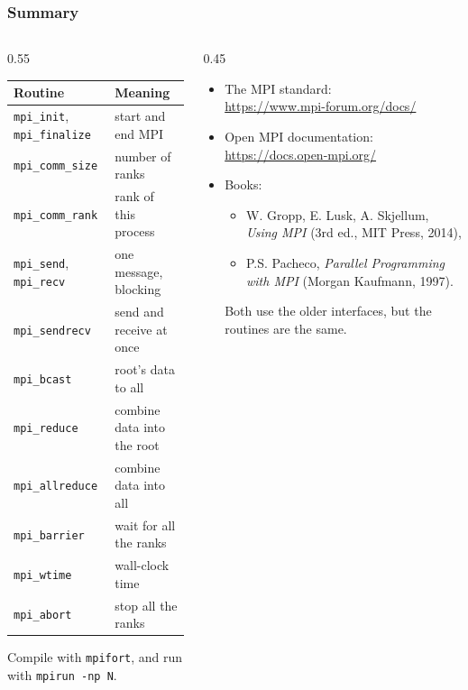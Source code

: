 \begin{frame}
  \frametitle{Summary}
  \begin{columns}[T]
    \begin{column}{0.55\textwidth}
      \centering
      \footnotesize
      \begin{tabular}{ll}
        \textbf{Routine} & \textbf{Meaning} \\
        \hline
        \texttt{mpi\_init}, \texttt{mpi\_finalize} & start and end MPI \\
        \texttt{mpi\_comm\_size}  & number of ranks \\
        \texttt{mpi\_comm\_rank}  & rank of this process \\
        \texttt{mpi\_send}, \texttt{mpi\_recv} & one message, blocking \\
        \texttt{mpi\_sendrecv}    & send and receive at once \\
        \texttt{mpi\_bcast}       & root's data to all \\
        \texttt{mpi\_reduce}      & combine data into the root \\
        \texttt{mpi\_allreduce}   & combine data into all \\
        \texttt{mpi\_barrier}     & wait for all the ranks \\
        \texttt{mpi\_wtime}       & wall-clock time \\
        \texttt{mpi\_abort}       & stop all the ranks \\
        \hline
      \end{tabular}

      \vspace*{2mm}
      \raggedright
      Compile with \texttt{mpifort}, and run with \texttt{mpirun -np N}.
    \end{column}

    \begin{column}{0.45\textwidth}
      \small
      \begin{itemize}
        \item The MPI standard: \\ \url{https://www.mpi-forum.org/docs/}
        \item Open MPI documentation: \\ \url{https://docs.open-mpi.org/}
        \item Books:
          \begin{itemize}
            \item W. Gropp, E. Lusk, A. Skjellum, \emph{Using MPI} (3rd ed., MIT Press, 2014),
            \item P.S. Pacheco, \emph{Parallel Programming with MPI} (Morgan Kaufmann, 1997).
          \end{itemize}
          Both use the older interfaces, but the routines are the same.
      \end{itemize}
    \end{column}
  \end{columns}
\end{frame}


